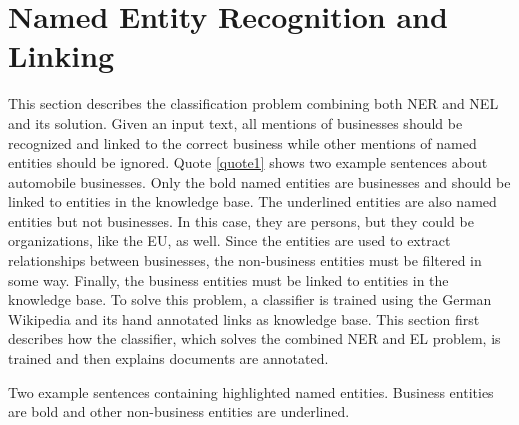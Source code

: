 \section{Named Entity Recognition and Linking}
\label{sec:NEL}
This section describes the classification problem combining both NER and NEL and its solution. Given an input text, all mentions of businesses should be recognized and linked to the correct business while other mentions of named entities should be ignored. Quote \ref{quote1} shows two example sentences about automobile businesses. Only the bold named entities are businesses and should be linked to entities in the knowledge base. The underlined entities are also named entities but not businesses. In this case, they are persons, but they could be organizations, like the EU, as well. Since the entities are used to extract relationships between businesses, the non-business entities must be filtered in some way. Finally, the business entities must be linked to entities in the knowledge base. To solve this problem, a classifier is trained using the German Wikipedia and its hand annotated links as knowledge base. This section first describes how the classifier, which solves the combined NER and EL problem, is trained and then explains documents are annotated.\\
\begin{nscenter}
	\begin{quotecaption}
	Two example sentences containing highlighted named entities. Business entities are bold and other non-business entities are underlined.
	\label{quote1}
	\end{quotecaption}
\end{nscenter}

